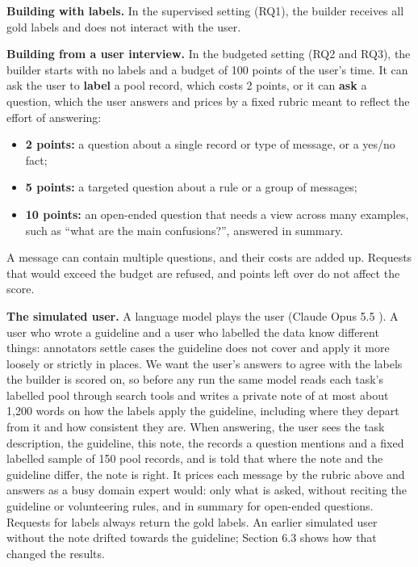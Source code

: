 \documentclass[11pt]{article}
\begin{document}
\textbf{Building with labels.} In the supervised setting (RQ1), the builder receives all gold labels and does not interact with the user.

\textbf{Building from a user interview.} In the budgeted setting (RQ2 and RQ3), the builder starts with no labels and a budget of 100 points of the user's time. It can ask the user to \textbf{label} a pool record, which costs 2 points, or it can \textbf{ask} a question, which the user answers and prices by a fixed rubric meant to reflect the effort of answering:

\begin{itemize}
\item \textbf{2 points:} a question about a single record or type of message, or a yes/no fact;
\item \textbf{5 points:} a targeted question about a rule or a group of messages;
\item \textbf{10 points:} an open-ended question that needs a view across many examples, such as ``what are the main confusions?'', answered in summary.
\end{itemize}

A message can contain multiple questions, and their costs are added up. Requests that would exceed the budget are refused, and points left over do not affect the score.

\textbf{The simulated user.} A language model plays the user (Claude Opus 5.5 \citep{anthropic2026}). A user who wrote a guideline and a user who labelled the data know different things: annotators settle cases the guideline does not cover and apply it more loosely or strictly in places. We want the user's answers to agree with the labels the builder is scored on, so before any run the same model reads each task's labelled pool through search tools and writes a private note of at most about 1,200 words on how the labels apply the guideline, including where they depart from it and how consistent they are. When answering, the user sees the task description, the guideline, this note, the records a question mentions and a fixed labelled sample of 150 pool records, and is told that where the note and the guideline differ, the note is right. It prices each message by the rubric above and answers as a busy domain expert would: only what is asked, without reciting the guideline or volunteering rules, and in summary for open-ended questions. Requests for labels always return the gold labels. An earlier simulated user without the note drifted towards the guideline; Section 6.3 shows how that changed the results.
\end{document}
